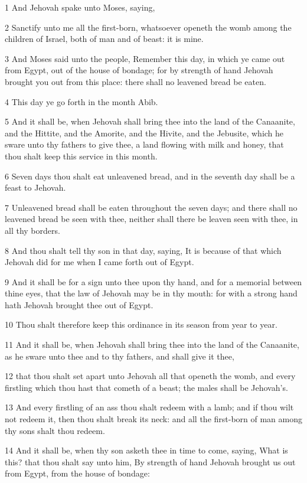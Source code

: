 \par 1 And Jehovah spake unto Moses, saying,
\par 2 Sanctify unto me all the first-born, whatsoever openeth the womb among the children of Israel, both of man and of beast: it is mine.
\par 3 And Moses said unto the people, Remember this day, in which ye came out from Egypt, out of the house of bondage; for by strength of hand Jehovah brought you out from this place: there shall no leavened bread be eaten.
\par 4 This day ye go forth in the month Abib.
\par 5 And it shall be, when Jehovah shall bring thee into the land of the Canaanite, and the Hittite, and the Amorite, and the Hivite, and the Jebusite, which he sware unto thy fathers to give thee, a land flowing with milk and honey, that thou shalt keep this service in this month.
\par 6 Seven days thou shalt eat unleavened bread, and in the seventh day shall be a feast to Jehovah.
\par 7 Unleavened bread shall be eaten throughout the seven days; and there shall no leavened bread be seen with thee, neither shall there be leaven seen with thee, in all thy borders.
\par 8 And thou shalt tell thy son in that day, saying, It is because of that which Jehovah did for me when I came forth out of Egypt.
\par 9 And it shall be for a sign unto thee upon thy hand, and for a memorial between thine eyes, that the law of Jehovah may be in thy mouth: for with a strong hand hath Jehovah brought thee out of Egypt.
\par 10 Thou shalt therefore keep this ordinance in its season from year to year.
\par 11 And it shall be, when Jehovah shall bring thee into the land of the Canaanite, as he sware unto thee and to thy fathers, and shall give it thee,
\par 12 that thou shalt set apart unto Jehovah all that openeth the womb, and every firstling which thou hast that cometh of a beast; the males shall be Jehovah's.
\par 13 And every firstling of an ass thou shalt redeem with a lamb; and if thou wilt not redeem it, then thou shalt break its neck: and all the first-born of man among thy sons shalt thou redeem.
\par 14 And it shall be, when thy son asketh thee in time to come, saying, What is this? that thou shalt say unto him, By strength of hand Jehovah brought us out from Egypt, from the house of bondage:
